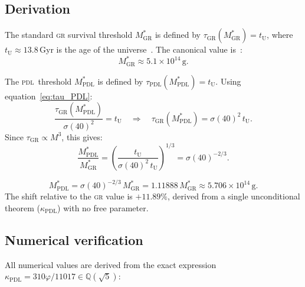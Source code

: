 \documentclass[12pt, a4paper]{article}
\theoremstyle{definition}
\newenvironment{prediction}[1][]{%
  \begin{tcolorbox}[colback=blue!5, colframe=blue!50!black,
    title={\textbf{Falsifiable prediction — #1}}, fonttitle=\bfseries]}
  {\end{tcolorbox}}
\newcommand{\PDL}{\textsc{pdl}}
\newcommand{\kappaPDL}{\kappa_{\mathrm{PDL}}}
\newcommand{\MstarGR}{M^{*}_{\mathrm{GR}}}
\newcommand{\MstarPDL}{M^{*}_{\mathrm{PDL}}}
\newcommand{\tU}{t_{\mathrm{U}}}
\newcommand{\phigold}{\varphi}
\begin{document}
\subsection{Derivation}

The standard \textsc{gr} survival threshold $\MstarGR$ is defined by $\tau_{\mathrm{GR}}(\MstarGR) = \tU$, where $\tU \approx 13.8$\,Gyr is the age of the universe~\cite{Planck2018}. The canonical value is~\cite{MacGibbon1991,Carr2021}:
\begin{equation}
  \MstarGR \approx 5.1 \times 10^{14}\,\mathrm{g}.
\end{equation}

The \PDL\ threshold $\MstarPDL$ is defined by $\tau_{\mathrm{PDL}}(\MstarPDL) = \tU$. Using equation~\eqref{eq:tau_PDL}:
\begin{equation}
  \frac{\tau_{\mathrm{GR}}(\MstarPDL)}{\sigma(40)^2} = \tU
  \quad\Rightarrow\quad
  \tau_{\mathrm{GR}}(\MstarPDL) = \sigma(40)^2\,\tU.
\end{equation}
Since $\tau_{\mathrm{GR}} \propto M^3$, this gives:
\begin{equation}
  \frac{\MstarPDL}{\MstarGR} = \left(\frac{\tU}{\sigma(40)^2\,\tU}\right)^{1/3} = \sigma(40)^{-2/3}.
  \label{eq:ratio}
\end{equation}

\begin{prediction}[\PDL\ survival threshold]
\begin{equation}
  \boxed{\MstarPDL = \sigma(40)^{-2/3}\,\MstarGR = 1.11888\,\MstarGR \approx 5.706 \times 10^{14}\,\mathrm{g}.}
  \label{eq:MstarPDL}
\end{equation}
The shift relative to the \textsc{gr} value is $+11.89\%$, derived from a single unconditional theorem ($\kappaPDL$) with no free parameter.
\end{prediction}

\subsection{Numerical verification}

All numerical values are derived from the exact expression $\kappaPDL = 310\phigold/11017 \in \mathbb{Q}(\sqrt{5})$:
\end{document}

